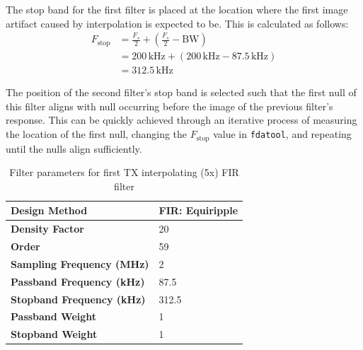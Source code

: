 The stop band for the first filter is placed at the location where the first
image artifact caused by interpolation is expected to be. This is calculated as
follows:
\begin{align*}
  F_{\text{stop}} &= \frac{F_s}{2} + \left( \frac{F_s}{2} - \text{BW} \right) \\
  &= 200 \,\text{kHz} + \left( 200 \,\text{kHz} - 87.5 \,\text{kHz} \right) \\
  &= 312.5 \,\text{kHz}
\end{align*}

The position of the second filter's stop band is selected such that the first
null of this filter aligns with null occurring before the image of the previous
filter's response. This can be quickly achieved through an iterative process of
measuring the location of the first null, changing the $F_{\text{stop}}$ value
in \texttt{fdatool}, and repeating until the nulls align sufficiently.

\begin{table}[h]
  \centering
  \caption{Filter parameters for first TX interpolating (5x) FIR filter}
  \label{tab:tx_interp_fir1}
  \footnotesize
  \begin{tabular} {|l|l|}
    \hline
    \textbf{Design Method}              & FIR: Equiripple \\ \hline
    \textbf{Density Factor}             & 20              \\ \hline
    \textbf{Order}                      & 59              \\ \hline
    \textbf{Sampling Frequency (MHz)}   & 2               \\ \hline
    \textbf{Passband Frequency (kHz)}   & 87.5            \\ \hline
    \textbf{Stopband Frequency (kHz)}   & 312.5           \\ \hline
    \textbf{Passband Weight}            & 1               \\ \hline
    \textbf{Stopband Weight}            & 1               \\ \hline
  \end{tabular}
\end{table}

